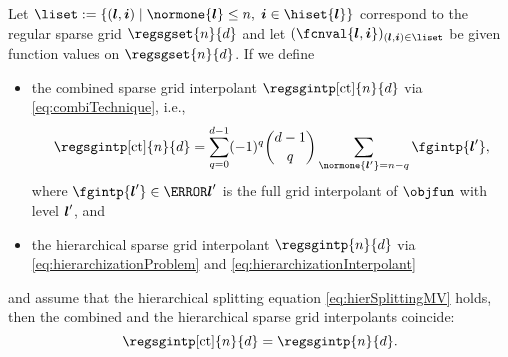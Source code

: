 \begin{theorem}
  \label{thm:combiTechnique}
  Let $\liset := \{(\*l, \*i) \mid
  \normone{\*l} \le n,\; \*i \in \hiset{\*l}\}$
  correspond to the regular sparse grid
  $\regsgset{n}{d}$ and let $(\fcnval{\*l,\*i})_{(\*l,\*i) \in \liset}$
  be given function values on $\regsgset{n}{d}$.
  If we define
  \begin{itemize}
    \item
    the combined sparse grid interpolant $\regsgintp[\ct]{n}{d}$ via
    \eqref{eq:combiTechnique}, i.e.,
    \begin{equation}
      \regsgintp[\ct]{n}{d}
      = \sum_{q=0}^{d-1} (-1)^q \binom{d-1}{q} \sum_{\normone{\*l'} = n-q}
      \fgintp{\*l'},
    \end{equation}
    where $\fgintp{\*l'} \in \ns{\*l'}$ is the full grid interpolant
    of $\objfun$ with level ${\boldsymbol{l}}'$, and
    
    \item
    the hierarchical sparse grid interpolant $\regsgintp{n}{d}$
    via \eqref{eq:hierarchizationProblem} and
    \eqref{eq:hierarchizationInterpolant}
  \end{itemize}
  and assume that the hierarchical splitting equation
  \eqref{eq:hierSplittingMV} holds,
  then the combined and the hierarchical sparse grid interpolants coincide:
  \begin{equation}
    \regsgintp[\ct]{n}{d}
    = \regsgintp{n}{d}.
  \end{equation}
\end{theorem}

